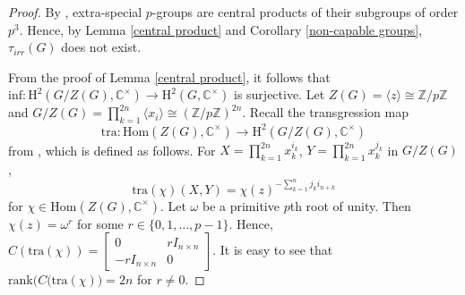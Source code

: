 \documentclass[a4paper,11pt]{amsart}
\numberwithin{equation}{section}
\numberwithin{equation}{subsection}
\newcommand{\C}{\mathbb{C}}
\newcommand{\Z}{\mathbb{Z}}
\newcommand{\poonam}[1]{{\color{blue} #1}}
\begin{document}
\begin{proof}
	By \cite[Chapter 4, Theorem 7.1]{karpilovsky}, extra-special $p$-groups are central products of their subgroups of order $p^3$. Hence, by Lemma \ref{central product} and Corollary \ref{non-capable groups}, $\tau_{irr}(G)$ does not exist. %
	
	From the proof of Lemma \ref{central product}, it follows that $\mathrm{inf}: \mathrm{H}^2(G/Z(G), \C^{\times}) \to \mathrm{H}^2(G, \C^{\times})$ is surjective.  %
	Let $Z(G) = \langle z \rangle \cong \Z/p\Z$ and $G/Z(G) = \prod_{k=1}^{2n}\langle x_i \rangle \cong (\Z/p\Z)^{2n}$. 
	Recall the transgression map 
	$$\mathrm{tra} : \mathrm{Hom}(Z(G), \mathbb{C}^{\times}) \to \mathrm{H}^2(G/Z(G), \mathbb{C}^{\times})$$ from \cite[Proof of Theorem 1.7]{sabnam}, which is
	defined as follows. For $X = \prod_{k=1}^{2n} x_k^{i_k}$,
	$Y = \prod_{k=1}^{2n} x_k^{j_k} $ in $G/Z(G)$, $$\mathrm{tra}(\chi)(X, Y) = \chi(z)^{-\sum_{k=1}^n j_k i_{n+k}}$$ for  $\chi \in \mathrm{Hom}(Z(G), \mathbb{C}^{\times})$. Let $\omega$ be a primitive $p$th root of unity. Then $\chi(z)= \omega^r$ for some $r\in \{0,1,\dots,p-1\}$.
	Hence, $C(\mathrm{tra}(\chi))= 
	\begin{bmatrix}
		0 & rI_{n \times n} \\
		-rI_{n \times n} & 0
	\end{bmatrix}$.
	It is easy to see that $\text{rank}\big(C(\mathrm{tra}(\chi)\big) = 2n$ for $r\neq 0$. 
	

\end{proof}
\end{document}
